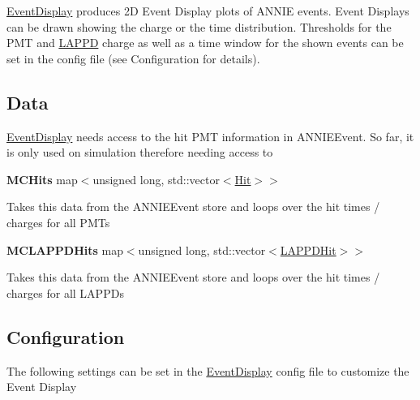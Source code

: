 \hyperlink{classEventDisplay}{Event\-Display} produces 2\-D Event Display plots of A\-N\-N\-I\-E events. Event Displays can be drawn showing the charge or the time distribution. Thresholds for the P\-M\-T and \hyperlink{classLAPPD}{L\-A\-P\-P\-D} charge as well as a time window for the shown events can be set in the config file (see Configuration for details).

\subsection*{Data}

\hyperlink{classEventDisplay}{Event\-Display} needs access to the hit P\-M\-T information in A\-N\-N\-I\-E\-Event. So far, it is only used on simulation therefore needing access to

{\bfseries M\-C\-Hits} {\ttfamily map$<$unsigned long, std\-::vector$<$\hyperlink{classHit}{Hit}$>$$>$}
\begin{DoxyItemize}
\item Takes this data from the {\ttfamily A\-N\-N\-I\-E\-Event} store and loops over the hit times / charges for all P\-M\-Ts
\end{DoxyItemize}

{\bfseries M\-C\-L\-A\-P\-P\-D\-Hits} {\ttfamily map$<$unsigned long, std\-::vector$<$\hyperlink{classLAPPDHit}{L\-A\-P\-P\-D\-Hit}$>$$>$}
\begin{DoxyItemize}
\item Takes this data from the {\ttfamily A\-N\-N\-I\-E\-Event} store and loops over the hit times / charges for all L\-A\-P\-P\-Ds
\end{DoxyItemize}

\subsection*{Configuration}

The following settings can be set in the \hyperlink{classEventDisplay}{Event\-Display} config file to customize the Event Display

